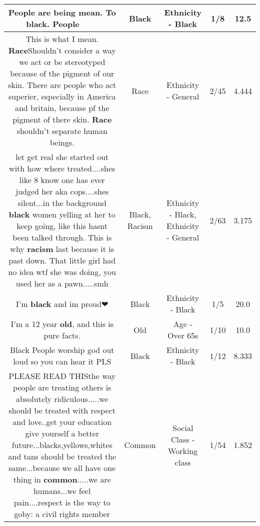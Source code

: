 \documentclass[11pt]{article}
\newlength\mylength
\begin{document}
\begin{center}
\begin{longtable}{|C{.65\mylength}|C{.30\mylength}|C{.12\mylength}|C{.12\mylength}|C{.12\mylength}|}
  \small People are being mean. To \textbf{black}.   People 🥺🥺🥺🥺🥺🥺🥺\normalsize   & Black & Ethnicity - Black & 1/8 & 12.5 \\  \hline
  \small This is what I mean. \textbf{Race}Shouldn't consider a way we act or  be stereotyped because of the pigment of our skin. There are people who act superier, especially in America and britain, because pf the pigment of there skin. \textbf{Race} shouldn't separate human beings.\normalsize   & Race & Ethnicity - General & 2/45 & 4.444 \\  \hline
  \small let get real she started out with how where treated....shes like 8 know one has ever judged her aka cops....shes silent...in the background \textbf{black} women yelling at her to keep going, like this hasnt been talked through. This is why \textbf{racism} last because it is past down. That little girl had no idea wtf she was doing, you used her as a pawn.....smh\normalsize   & Black, Racism & Ethnicity - Black, Ethnicity - General & 2/63 & 3.175 \\  \hline
  \small I'm \textbf{black} and im proud❤\normalsize   & Black & Ethnicity - Black & 1/5 & 20.0 \\  \hline
  \small I'm a 12 year \textbf{old}, and this is pure facts.\normalsize   & Old & Age - Over 65s & 1/10 & 10.0 \\  \hline
  \small Black People worship god out loud so you can hear it PLS\normalsize   & Black & Ethnicity - Black & 1/12 & 8.333 \\  \hline
  \small PLEASE READ THISthe way people are treating others is absolutely ridiculous.....we should be treated with respect and love..get your education give yourself a better future...blacks,yellows,whites and tans should be treated the same...because we all have one thing in \textbf{common}.....we are humans...we feel pain....respect is the way to goby: a civil rights member\normalsize   & Common & Social Class - Working class & 1/54 & 1.852 \\  \hline

\end{longtable}
\end{center}
\end{document}
